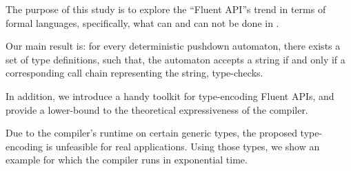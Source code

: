 The purpose of this study is to explore the ``Fluent API''s trend in
  terms of formal languages, specifically, what can and can not be done 
  in \Java.

Our main result is: for every deterministic pushdown automaton,
  there exists a set of \Java type definitions, such that,
  the automaton accepts a string if and only if a corresponding 
  call chain representing the string, type-checks.

In addition, we introduce a handy toolkit for type-encoding Fluent APIs,
and provide a lower-bound to the theoretical expressiveness of the \Java compiler.
  
Due to the compiler's runtime on certain generic types,
  the proposed type-encoding is unfeasible for real applications.
Using those types, we show an example for which the compiler runs in exponential time.